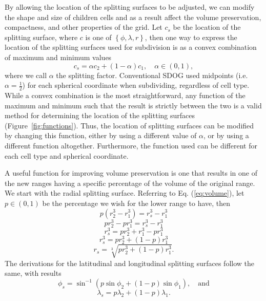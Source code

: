 By allowing the location of the splitting surfaces to be adjusted, we can modify the shape and size of children cells and as a result affect the volume preservation, compactness, and other properties of the grid.
Let $c_{s}$ be the location of the splitting surface, where $c$ is one of $\left\lbrace \phi, \lambda, r \right\rbrace$, then one way to express the location of the splitting surfaces used for subdivision is as a convex combination of maximum and minimum values
%
\begin{equation} \label{eq:convex}
c_{s} = \alpha c_{2} + \left( 1-\alpha \right) c_{1}, \quad \alpha \in \left( 0, 1 \right),
\end{equation}
%
where we call $\alpha$ the splitting factor.
Conventional SDOG used midpoints (i.e.
$\alpha = \frac{1}{2}$) for each spherical coordinate when subdividing, regardless of cell type.
While a convex combination is the most straightforward, any function of the maximum and minimum such that the result is strictly between the two is a valid method for determining the location of the splitting surfaces (Figure~\ref{fig:functions}).
Thus, the location of splitting surfaces can be modified by changing this function, either by using a different value of $\alpha$, or by using a different function altogether.
Furthermore, the function used can be different for each cell type and spherical coordinate.


A useful function for improving volume preservation is one that results in one of the new ranges having a specific percentage of the volume of the original range.
We start with the radial splitting surface.
Referring to Eq.
(\ref{eq:volume}), let $p \in (0,1)$ be the percentage we wish for the lower range to have, then
%
\begin{equation*}
p \left( r_{2}^{3} - r_{1}^{3} \right) = r_{s}^{3} - r_{1}^{3}
\end{equation*}
%
\begin{equation*}
p r_{2}^{3} - p r_{1}^{3} = r_{s}^{3} - r_{1}^{3}
\end{equation*}
%
\begin{equation*}
r_{s}^{3} = p r_{2}^{3} + r_{1}^{3} - p r_{1}^{3}
\end{equation*}
%
\begin{equation*}
r_{s}^{3} = p r_{2}^{3} + \left( 1 - p \right) r_{1}^{3}
\end{equation*}
%
\begin{equation} \label{eq:radVol}
r_{s} = \sqrt[3]{ p r_{2}^{3} + \left( 1 - p \right) r_{1}^{3} }.
\end{equation}
%
The derivations for the latitudinal and longitudinal splitting surfaces follow the same, with results
%
\begin{equation} \label{eq:latVol}
\phi_{s} = \sin^{-1} \left( p \sin\phi_{2} + \left( 1 - p \right) \sin\phi_{1} \right), \quad\text{and}
\end{equation}
%
\begin{equation} \label{eq:longVol}
\lambda_{s} = p \lambda_{2} + \left( 1 - p \right) \lambda_{1}.
\end{equation}


